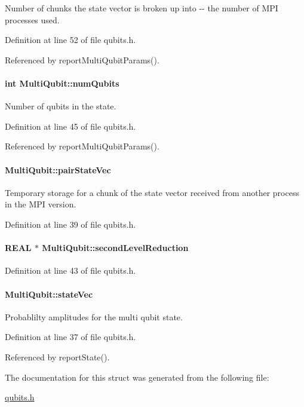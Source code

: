 Number of chunks the state vector is broken up into -\/-\/ the number of MPI processes used. 

Definition at line 52 of file qubits.h.

Referenced by reportMultiQubitParams().\hypertarget{structMultiQubit_ab5b9795bdc6fb5855e1974dcbbaeb36f}{
\paragraph[{numQubits}]{\setlength{\rightskip}{0pt plus 5cm}int {\bf MultiQubit::numQubits}}\hfill}
\label{structMultiQubit_ab5b9795bdc6fb5855e1974dcbbaeb36f}


Number of qubits in the state. 

Definition at line 45 of file qubits.h.

Referenced by reportMultiQubitParams().\hypertarget{structMultiQubit_a76f7db4eab52d2b30f58f973ada809c5}{
\paragraph[{pairStateVec}]{ {\bf MultiQubit::pairStateVec}}\hfill}
\label{structMultiQubit_a76f7db4eab52d2b30f58f973ada809c5}


Temporary storage for a chunk of the state vector received from another process in the MPI version. 

Definition at line 39 of file qubits.h.\hypertarget{structMultiQubit_a3e859cefa146ec7b30464ab3d897930b}{
\paragraph[{secondLevelReduction}]{\setlength{\rightskip}{0pt plus 5cm}REAL $\ast$ {\bf MultiQubit::secondLevelReduction}}\hfill}
\label{structMultiQubit_a3e859cefa146ec7b30464ab3d897930b}


Definition at line 43 of file qubits.h.\hypertarget{structMultiQubit_a45483190d6b01ef6b2f98f2bec9ab94f}{
\paragraph[{stateVec}]{ {\bf MultiQubit::stateVec}}\hfill}
\label{structMultiQubit_a45483190d6b01ef6b2f98f2bec9ab94f}


Probablilty amplitudes for the multi qubit state. 

Definition at line 37 of file qubits.h.

Referenced by reportState().

The documentation for this struct was generated from the following file:\begin{DoxyCompactItemize}
\item 
\hyperlink{qubits_8h}{qubits.h}\end{DoxyCompactItemize}
